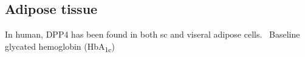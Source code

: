 \subsection{Adipose tissue}
In human, DPP4 has been found in both sc and viseral adipose cells.~\cite{Lamers2011} Baseline glycated hemoglobin (HbA\textsubscript{1c}) 